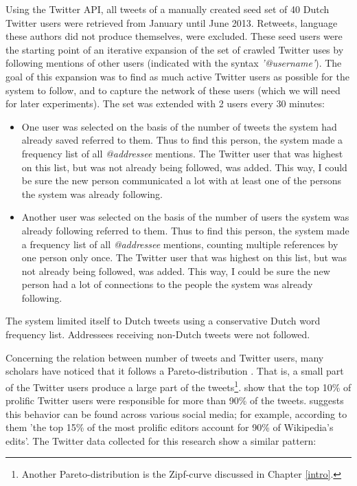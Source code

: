 \documentclass[11pt]{article}
\begin{document}
Using the Twitter API, all tweets of a manually created seed set of 40 Dutch Twitter users were retrieved from January until June 2013. Retweets, language these authors did not produce themselves, were excluded. These seed users were the starting point of an iterative expansion of the set of crawled Twitter uses by following mentions of other users (indicated with the syntax \emph{'@username'}). The goal of this expansion was to find as much active Twitter users as possible for the system to follow, and to capture the network of these users (which we will need for later experiments). The set was extended with 2 users every 30 minutes:

\begin{itemize}
\item One user was selected on the basis of the number of tweets the system had already saved referred to them. Thus to find this person, the system made a frequency list of all \emph{@addressee} mentions. The Twitter user that was highest on this list, but was not already being followed, was added. This way, I could be sure the new person communicated a lot with at least one of the persons the system was already following.
\item Another user was selected on the basis of the number of users the system was already following referred to them. Thus to find this person, the system made a frequency list of all \emph{@addressee} mentions, counting multiple references by one person only once. The Twitter user that was highest on this list, but was not already being followed, was added. This way, I could be sure the new person had a lot of connections to the people the system was already following.
\end{itemize}

The system limited itself to Dutch tweets using a conservative Dutch word frequency list. Addressees receiving non-Dutch tweets were not followed.

Concerning the relation between number of tweets and Twitter users, many scholars have noticed that it follows a Pareto-distribution . That is, a small part of the Twitter users produce a large part of the tweets\footnote{Another Pareto-distribution is the Zipf-curve discussed in Chapter \ref{intro}.}.  show that the top 10\% of prolific Twitter users were responsible for more than 90\% of the tweets.  suggests this behavior can be found across various social media; for example, according to them 'the top 15\% of the most prolific editors account for 90\% of Wikipedia's edits'. The Twitter data collected for this research show a similar pattern:
\end{document}
